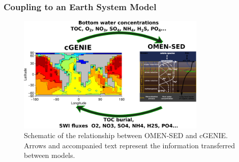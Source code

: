 \documentclass[gmd, manuscript]{copernicus}
\begin{document}
\subsubsection{Coupling to an Earth System Model}\label{subsubsec:ESM_coupling}
\begin{figure}[tbp]
\begin{center}
	\includegraphics[width=0.8\textwidth]{figures/OMEN-GENIE-coupling.pdf}
	\caption{Schematic of the relationship between OMEN-SED and cGENIE. Arrows and accompanied text represent the information transferred between models. }
	\label{fig:OMEN-GENIE-coupling}
	\end{center}
\end{figure}
\end{document}
